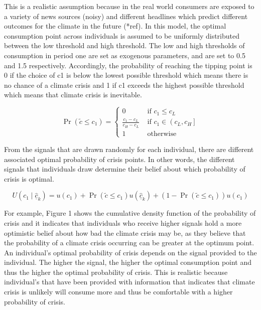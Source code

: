 \documentclass[11pt,preprint, authoryear]{elsarticle}
\numberwithin{equation}{section}
\numberwithin{figure}{section}
\numberwithin{table}{section}
\begin{document}
This is a realistic assumption because in the real world consumers are
exposed to a variety of news sources (noisy) and different headlines
which predict different outcomes for the climate in the future (*ref).
In this model, the optimal consumption point across individuals is
assumed to be uniformly distributed between the low threshold and high
threshold. The low and high thresholds of consumption in period one are
set as exogenous parameters, and are set to 0.5 and 1.5 respectively.
Accordingly, the probability of reaching the tipping point is 0 if the
choice of c1 is below the lowest possible threshold which means there is
no chance of a climate crisis and 1 if c1 exceeds the highest possible
threshold which means that climate crisis is inevitable.

\[
\operatorname{Pr}\left(\tilde{c} \leq c_1\right)=\left\{\begin{array}{cc}
0 & \text { if } c_1 \leq c_L \\
\frac{c_1-c_L}{c_H-c_L} & \text { if } c_1 \in\left(c_L, c_H\right] \\
1 & \text { otherwise }
\end{array}\right.
\]

From the signals that are drawn randomly for each individual, there are
different associated optimal probability of crisis points. In other
words, the different signals that individuals draw determine their
belief about which probability of crisis is optimal.

\[
U\left(c_1 \mid \hat{\underline{c}}_{k}\right)=u\left(c_1\right)+\operatorname{Pr}\left(\tilde{c} \leq c_1\right) u\left(\hat{\underline{c}}_{k}\right)+\left(1-\operatorname{Pr}\left(\tilde{c} \leq c_1\right)\right) u\left(c_1\right)
\]

For example, Figure 1 shows the cumulative density function of the
probability of crisis and it indicates that individuals who receive
higher signals hold a more optimistic belief about how bad the climate
crisis may be, as they believe that the probability of a climate crisis
occurring can be greater at the optimum point. An individual's optimal
probability of crisis depends on the signal provided to the individual.
The higher the signal, the higher the optimal consumption point and thus
the higher the optimal probability of crisis. This is realistic because
individual's that have been provided with information that indicates
that climate crisis is unlikely will consume more and thus be
comfortable with a higher probability of crisis.
\end{document}
